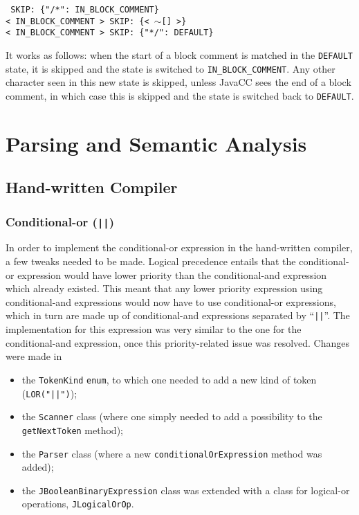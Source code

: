 \documentclass[11pt]{article}
\newcommand{\java}[1]{\texttt{#1}}
\begin{document}
\noindent\texttt{
SKIP: \{"/*": IN\_BLOCK\_COMMENT\}\\
< IN\_BLOCK\_COMMENT > SKIP: \{< \(\sim\)[] >\}\\
< IN\_BLOCK\_COMMENT > SKIP: \{"*/": DEFAULT\}}

It works as follows: when the start of a block comment is matched in the  \texttt{DEFAULT} state, it is skipped and the state is switched to \texttt{IN\_BLOCK\_COMMENT}.
Any other character seen in this new state is skipped, unless JavaCC sees the end of a block comment, in which case this is skipped and the state is switched back to \texttt{DEFAULT}.

\section{Parsing and Semantic Analysis}
\subsection{Hand-written Compiler}
\subsubsection{Conditional-or (\java{||})}
In order to implement the conditional-or expression in the hand-written compiler, a few tweaks needed to be made.
Logical precedence entails that the conditional-or expression would have lower priority than the conditional-and expression which already existed.
This meant that any lower priority expression using conditional-and expressions would now have to use conditional-or expressions, which in turn are made up of conditional-and expressions separated by ``\java{||}''. The implementation for this expression was very similar to the one for the conditional-and expression, once this priority-related issue was resolved.
Changes were made in
\begin{itemize}
	\item the \java{TokenKind} \java{enum}, to which one needed to add a new kind of token (\java{LOR("||")});
	\item the \java{Scanner} class (where one simply needed to add a possibility to the \java{getNextToken} method);
	\item the \java{Parser} class (where a new \java{conditionalOrExpression} method was added);
	\item the \java{JBooleanBinaryExpression} class was extended with a class for logical-or operations, \java{JLogicalOrOp}.
\end{itemize}
\end{document}
